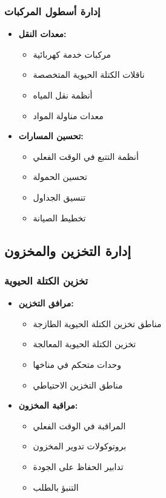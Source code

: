 \subsubsection{إدارة أسطول المركبات}
\begin{itemize}
    \item \textbf{معدات النقل:}
    \begin{itemize}
        \item مركبات خدمة كهربائية
        \item ناقلات الكتلة الحيوية المتخصصة
        \item أنظمة نقل المياه
        \item معدات مناولة المواد
    \end{itemize}
    
    \item \textbf{تحسين المسارات:}
    \begin{itemize}
        \item أنظمة التتبع في الوقت الفعلي
        \item تحسين الحمولة
        \item تنسيق الجداول
        \item تخطيط الصيانة
    \end{itemize}
\end{itemize}

\subsection{إدارة التخزين والمخزون}

\subsubsection{تخزين الكتلة الحيوية}
\begin{itemize}
    \item \textbf{مرافق التخزين:}
    \begin{itemize}
        \item مناطق تخزين الكتلة الحيوية الطازجة
        \item تخزين الكتلة الحيوية المعالجة
        \item وحدات متحكم في مناخها
        \item مناطق التخزين الاحتياطي
    \end{itemize}
    
    \item \textbf{مراقبة المخزون:}
    \begin{itemize}
        \item المراقبة في الوقت الفعلي
        \item بروتوكولات تدوير المخزون
        \item تدابير الحفاظ على الجودة
        \item التنبؤ بالطلب
    \end{itemize}
\end{itemize}

